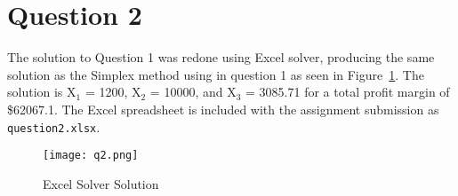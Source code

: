\section*{Question 2}
The solution to Question 1 was redone using Excel solver, producing the same solution as the Simplex method using in question 1 as seen in Figure~\ref{fig:q2}. The solution is X$_1$ = 1200, X$_2$ = 10000, and X$_3$ = 3085.71 for a total profit margin of \$62067.1. The Excel spreadsheet is included with the assignment submission as \texttt{question2.xlsx}.

\begin{figure}[htp]
    \centering
    \texttt{[image: q2.png]}
    \caption{\label{fig:q2}Excel Solver Solution}
\end{figure}